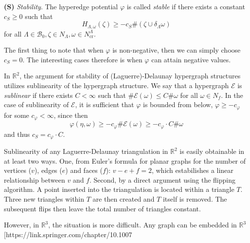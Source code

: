 \documentclass[12pt,a4paper]{report}
\newcommand{\R}{\mathbb R^3}
\begin{document}
\textbf{(S)} \textit{Stability}. The hyperedge potential $\varphi$ is called \textit{stable} if there exists a constant $c_S \geq 0$ such that 
$$H_{\Lambda,\omega}(\zeta) \geq -c_S \#(\zeta \cup \delta_\Lambda \omega)$$
for all $\Lambda \in \mathcal B_0, \zeta \in N_\Lambda, \omega \in N^\Lambda_{\text{cr}}$.

The first thing to note that when $\varphi$ is non-negative, then we can simply choose $c_S = 0$. The interesting cases therefore is when $\varphi$ can attain negative values.

In $\mathbb R^2$, the argument for stability of (Laguerre)-Delaunay hypergraph structures utilizes sublinearity of the hypergraph structure. We say that a hypergraph $\mathcal E$ is \textit{sublinear} if there exists $C < \infty$ such that $\# \mathcal E(\omega) \leq C \# \omega$ for all $\omega \in N_f$. In the case of sublinearity of $\mathcal E$, it is sufficient that $\varphi$ is bounded from below, $\varphi \geq - c_\varphi$ for some $c_\varphi < \infty$, since then 
$$\varphi(\eta,\omega) \geq -c_\varphi \#\mathcal E(\omega) \geq -c_\varphi\cdot C \# \omega$$ 
and thus $c_S = c_\varphi \cdot C$.

Sublinearity of any Laguerre-Delaunay triangulation in $\mathbb R^2$ is easily obtainable in at least two ways. One, from Euler's formula for planar graphs for the number of vertices ($v$), edges ($e$) and faces ($f$): $v-e+f=2$, which estabilishes a linear relationship between $v$ and $f$. Second, by a direct argument using the  flipping algorithm. A point inserted into the triangulation is located within a triangle $T$. Three new triangles within $T$ are then created and $T$ itself is removed. The subsequent flips then leave the total number of triangles constant.

However, in $\R$, the situation is more difficult. Any graph can be embedded in $\R$ [https://link.springer.com/chapter/10.1007%
\end{document}
